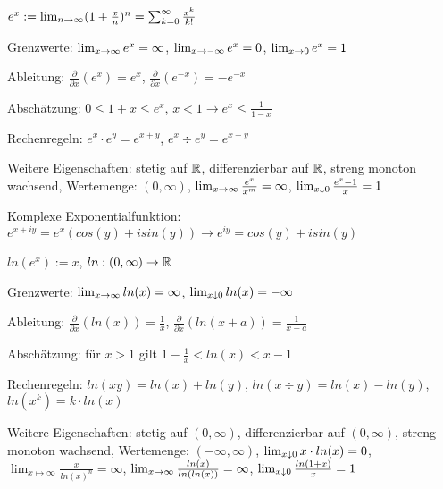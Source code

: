 \documentclass[]{article}
\begin{document}
\begin{definition}[Exponentialfunktion]
	$e^x := \lim_{n \rightarrow \infty} (1 + \frac{x}{n})^n = \sum_{k=0}^{\infty} \frac{x^k}{k!}$
	\begin{description} [noitemsep]
		\item Grenzwerte: $\lim_{x \rightarrow \infty} e^x = \infty$, $\lim_{x \rightarrow -\infty} e^x = 0$, $\lim_{x \rightarrow 0} e^x = 1$
		\item Ableitung: $\frac{\partial}{\partial x}(e^x) = e^x$, $\frac{\partial}{\partial x}(e^{-x}) = -e^{-x}$		
		\item Abschätzung: $ 0 \leq 1 + x \leq e^x$,  $x < 1 \rightarrow e^x \leq \frac{1}{1 - x}$ 
		\item Rechenregeln: $e^x \cdot e^y = e^{x+y}$, $e^x \div e^y = e^{x-y}$
		\item Weitere Eigenschaften: stetig auf $\mathbb{R}$, differenzierbar auf $\mathbb{R}$, streng monoton wachsend, Wertemenge: $(0, \infty)$, $\lim_{x \rightarrow \infty} \frac{e^x}{x^m} = \infty$, $\lim_{x \downarrow 0} \frac{e^x - 1}{x} = 1$
		\item Komplexe Exponentialfunktion: $e^{x+iy} = e^x(cos(y) + i sin(y)) \rightarrow e^{iy} = cos(y) + i sin(y)$
	\end{description}
\end{definition}

\begin{definition}[Logarithmusfunktion]
	$ln(e^x) := x$, $ln : (0, \infty) \rightarrow \mathbb{R}$
	
	\begin{description} [noitemsep]
		\item Grenzwerte: $\lim_{x \rightarrow \infty} ln (x) = \infty$, $\lim_{x \downarrow 0} ln (x )= - \infty$
		\item Ableitung: $\frac{\partial}{\partial x} (ln(x)) = \frac{1}{x}$, $\frac{\partial}{\partial x} (ln(x + a)) = \frac{1}{x + a}$
		\item Abschätzung: für $x > 1$ gilt $1 - \frac{1}{x} < ln(x) < x - 1$
		\item Rechenregeln: $ln(xy) = ln(x) + ln(y)$, $ln(x \div y) = ln(x) - ln(y)$, $ln(x^k) = k \cdot ln(x)$
		\item Weitere Eigenschaften: stetig auf $(0,\infty)$, differenzierbar auf $(0,\infty)$, streng monoton wachsend, Wertemenge: $(- \infty, \infty)$, $\lim_{x \downarrow 0} x \cdot ln(x) = 0$, $\lim_{x \mapsto \infty} \frac{x}{ln(x)^n} = \infty$,  $\lim_{x \rightarrow \infty} \frac{ln(x)}{ln(ln(x))} = \infty$,  $\lim_{x \downarrow 0} \frac{ln(1+x)}{x} = 1$
	\end{description}
\end{definition}
\end{document}
